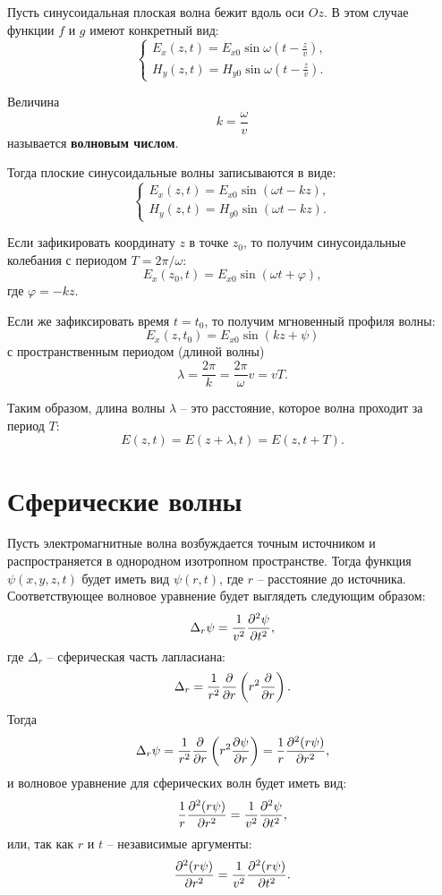 	Пусть синусоидальная плоская волна бежит вдоль оси \( Oz \). В этом случае
    функции \( f \) и \( g \) имеют конкретный вид:
	\[ 
        \left\{
        \begin{array}{l}
		    E_x(z, t) = E_{x0}\sin\omega\left(t - \frac{z}{v}\right), \\
		    H_y(z, t) = H_{y0}\sin\omega\left(t - \frac{z}{v}\right).
	    \end{array}
        \right.
    \]
	
	\begin{definition}
        Величина
        \[
            k = \frac{\omega}{v}
        \]
        называется \textbf{волновым числом}.
	\end{definition}
	
	Тогда плоские синусоидальные волны записываются в виде:
	\[
        \left\{
        \begin{array}{l}
		    E_x(z, t) = E_{x0}\sin(\omega t - kz), \\
		    H_y(z, t) = H_{y0}\sin(\omega t - kz).
	    \end{array}
        \right.
    \]
	
	Если зафикировать координату \( z \) в точке \( z_0 \), то получим
    синусоидальные колебания с периодом \( T = 2\pi/\omega \):
	\[
        E_x(z_0, t) = E_{x0}\sin(\omega t +  \varphi),
    \]
	где \( \varphi = -kz \).
	
	Если же зафиксировать время \( t = t_0 \), то получим мгновенный профиля
    волны:
	\[
        E_x(z, t_0) = E_{x0}\sin(kz + \psi)
    \]
	с пространственным периодом (длиной волны)
    \[
        \lambda = \frac{2\pi}{k} = \frac{2\pi}{\omega}v = vT.
    \]
	
	Таким образом, длина волны \( \lambda \) -- это расстояние, которое волна
    проходит за период \( T \):
	\[
        E(z, t) = E(z + \lambda, t) = E(z, t + T).
    \]
	
\section{Сферические волны}

	Пусть электромагнитные волна возбуждается точным источником и
    распространяется в однородном изотропном пространстве. Тогда функция
    \( \psi(x, y, z, t) \) будет иметь вид \( \psi(r, t) \), где \( r \) --
    расстояние до источника. Соответствующее волновое уравнение будет выглядеть
    следующим образом:
	\[
        \Delta_r\psi = \frac{1}{v^2}\frac{\partial^2 \psi}{\partial t^2},
    \]
	где \( \Delta_r \) -- сферическая часть лапласиана:
	\[
        \Delta_r = \frac{1}{r^2}\frac{\partial }{\partial r}\left(r^2\frac{\partial }{\partial r}\right).
    \]
	Тогда
	\[
        \Delta_r\psi = \frac{1}{r^2}\frac{\partial }{\partial r}
        \left(r^2\frac{\partial \psi}{\partial r}\right) = \frac{1}{r}\frac{\partial^2 (r\psi)}{\partial r^2},
    \]
	и волновое уравнение для сферических волн будет иметь вид:
	\[
        \frac{1}{r}\frac{\partial^2 (r\psi)}{\partial r^2} = \frac{1}{v^2}\frac{\partial^2 \psi}{\partial t^2},
    \]
	или, так как \( r \) и \( t \) -- независимые аргументы:
	\[
        \frac{\partial^2 (r\psi)}{\partial r^2} = \frac{1}{v^2}\frac{\partial^2 (r\psi)}{\partial t^2}.
    \]
	
